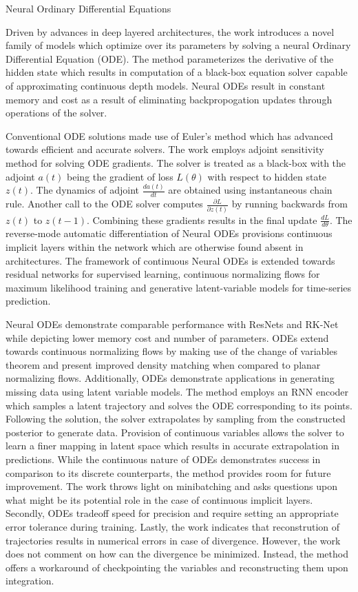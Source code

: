 \documentclass[11pt,letterpaper]{article}
\begin{document}
\begin{center}
  \large{Neural Ordinary Differential Equations}
\end{center}

Driven by advances in deep layered architectures, the work introduces a novel family of models which optimize over its parameters by solving a neural Ordinary Differential Equation (ODE). The method parameterizes the derivative of the hidden state which results in computation of a black-box equation solver capable of approximating continuous depth models. Neural ODEs result in constant memory and cost as a result of eliminating backpropogation updates through operations of the solver. 

Conventional ODE solutions made use of Euler's method which has advanced towards efficient and accurate solvers. The work employs adjoint sensitivity method for solving ODE gradients. The solver is treated as a black-box with the adjoint $a(t)$ being the gradient of loss $L(\theta)$ with respect to hidden state $z(t)$. The dynamics of adjoint $\frac{d a(t)}{dt}$ are obtained using instantaneous chain rule. Another call to the ODE solver computes $\frac{\partial L}{\partial z(t)}$ by running backwards from $z(t)$ to $z(t-1)$. Combining these gradients results in the final update $\frac{dL}{d\theta}$. The reverse-mode automatic differentiation of Neural ODEs provisions continuous implicit layers within the network which are otherwise found absent in architectures. The framework of continuous Neural ODEs is extended towards residual networks for supervised learning, continuous normalizing flows for maximum likelihood training and generative latent-variable models for time-series prediction. 

Neural ODEs demonstrate comparable performance with ResNets and RK-Net while depicting lower memory cost and number of parameters. ODEs extend towards continuous normalizing flows by making use of the change of variables theorem and present improved density matching when compared to planar normalizing flows. Additionally, ODEs demonstrate applications in generating missing data using latent variable models. The method employs an RNN encoder which samples a latent trajectory and solves the ODE corresponding to its points. Following the solution, the solver extrapolates by sampling from the constructed posterior to generate data. Provision of continuous variables allows the solver to learn a finer mapping in latent space which results in accurate extrapolation in predictions. While the continuous nature of ODEs demonstrates success in comparison to its discrete counterparts, the method provides room for future improvement. The work throws light on minibatching and asks questions upon what might be its potential role in the case of continuous implicit layers. Secondly, ODEs tradeoff speed for precision and require setting an appropriate error tolerance during training. Lastly, the work indicates that reconstrution of trajectories results in numerical errors in case of divergence. However, the work does not comment on how can the divergence be minimized. Instead, the method offers a workaround of checkpointing the variables and reconstructing them upon integration. 
\end{document}
